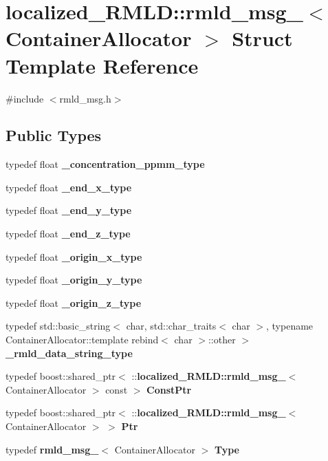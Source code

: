 \section{localized\_\-RMLD::rmld\_\-msg\_\-$<$ ContainerAllocator $>$ Struct Template Reference}
\label{structlocalized__RMLD_1_1rmld__msg__}


{\ttfamily \#include $<$rmld\_\-msg.h$>$}

\subsection*{Public Types}
\begin{DoxyCompactItemize}
\item 
typedef float {\bf \_\-concentration\_\-ppmm\_\-type}
\item 
typedef float {\bf \_\-end\_\-x\_\-type}
\item 
typedef float {\bf \_\-end\_\-y\_\-type}
\item 
typedef float {\bf \_\-end\_\-z\_\-type}
\item 
typedef float {\bf \_\-origin\_\-x\_\-type}
\item 
typedef float {\bf \_\-origin\_\-y\_\-type}
\item 
typedef float {\bf \_\-origin\_\-z\_\-type}
\item 
typedef std::basic\_\-string$<$ char, std::char\_\-traits$<$ char $>$, typename ContainerAllocator::template rebind$<$ char $>$::other $>$ {\bf \_\-rmld\_\-data\_\-string\_\-type}
\item 
typedef boost::shared\_\-ptr$<$ ::{\bf localized\_\-RMLD::rmld\_\-msg\_\-}$<$ ContainerAllocator $>$ const  $>$ {\bf ConstPtr}
\item 
typedef boost::shared\_\-ptr$<$ ::{\bf localized\_\-RMLD::rmld\_\-msg\_\-}$<$ ContainerAllocator $>$ $>$ {\bf Ptr}
\item 
typedef {\bf rmld\_\-msg\_\-}$<$ ContainerAllocator $>$ {\bf Type}
\end{DoxyCompactItemize}
